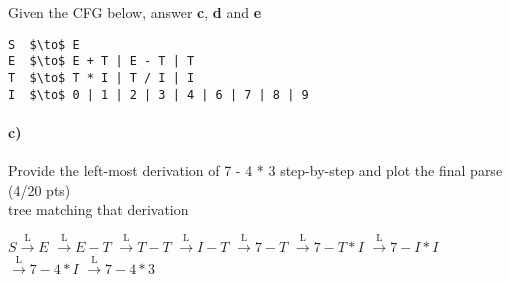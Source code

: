 \documentclass[a4paper,12pt]{article}
\begin{document}
\begin{tcolorbox}
\begin{center}


\end{center}

\begin{center}


\end{center}

\end{tcolorbox}

\newpage

Given the CFG below, answer \textbf{c}, \textbf{d} and \textbf{e} \\

\begin{lstlisting}[style=output,mathescape=true]
S  $\to$ E
E  $\to$ E + T | E - T | T
T  $\to$ T * I | T / I | I
I  $\to$ 0 | 1 | 2 | 3 | 4 | 6 | 7 | 8 | 9
\end{lstlisting}

\paragraph{c)} Provide the left-most derivation of 7 - 4 * 3 step-by-step and plot the final parse \hfill \small{(4/20 pts)} \\
tree matching that derivation \\

\begin{tcolorbox}
$S \xrightarrow{\text{L}} E$  $\xrightarrow{\text{L}} E-T$  $\xrightarrow{\text{L}} T-T$ $\xrightarrow{\text{L}} I-T$ $\xrightarrow{\text{L}} 7-T$  $\xrightarrow{\text{L}} 7-T*I$ $\xrightarrow{\text{L}} 7-I*I$ $\xrightarrow{\text{L}} 7-4*I$	$\xrightarrow{\text{L}} 7-4*3$

\end{tcolorbox}
\end{document}
